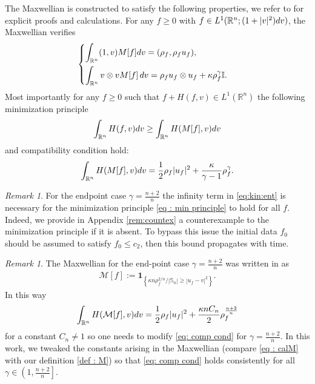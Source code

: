 \documentclass{amsart}
\theoremstyle{plain}
\theoremstyle{remark}
\newtheorem{remark}[theorem]{Remark}
\numberwithin{equation}{section}
\newcommand{\bbI}{\mathbb I}
\newcommand{\bbS}{\mathbb S}
\newcommand{\R}{\mathbb{R}}
\newcommand{\dv}{\textnormal{d}v}
\begin{document}
The Maxwellian is constructed to satisfy the following properties, we refer to \cite{bouchut1999,berthelinbouchut2000,choihwang2024} for explicit proofs and calculations. For any $f\ge 0$ with $f\in L^1(\R^n;(1+|v|^2)\dv)$, the Maxwellian verifies
\begin{equation*}
\begin{cases}
    \displaystyle\int_{\R^n} (1,v)M[f] \dv = (\rho_f, \rho_f u_f),\\[9pt]
    \displaystyle\int_{\R^n} v \otimes v M[f]  \, \dv = \rho_f u_f \otimes u_f + \kappa \rho_f^\gamma \bbI.
\end{cases}
\end{equation*}
Most importantly for any $f\ge 0$ such that $f+ H(f,v)\in L^1(\R^n)$ the following minimization principle
\begin{equation}\label{eq : min principle}
\int_{\R^n} H(f,v)\dv \ge \int_{\R^n} H(M[f],v)\dv
\end{equation}
and compatibility condition hold:
\begin{equation}
\label{eq: comp cond}
    \int_{\R^n} H(M[f],v)\dv = \frac{1}{2}\rho_f |u_f|^2 + \frac{\kappa}{\gamma-1} \rho_f^{\gamma}.
\end{equation}
\begin{remark}
    For the endpoint case $\gamma = \frac{n+2}{n}$ the infinity term in \eqref{eq:kin:ent} is necessary for the minimization principle \eqref{eq : min principle} to hold for all $f$. Indeed, we provide in Appendix \ref{rem:countex} a counterexample to the minimization principle if it is absent. To bypass this issue the initial data $f_0$ should be assumed to satisfy $f_0 \le c_2$, then this bound propagates with time.
\end{remark}
\begin{remark}
\label{rem : max const factor}
The Maxwellian for the end-point case $\gamma = \frac{n+2}{n}$ was written in \cite{berthelinvasseur2005, choihwang2024} as
\begin{align}
\label{eq : calM}
    \mathcal{M}[f] := \mathbf{1}_{\left\{ \kappa n\rho_f^{2/n}/|\bbS_n| \ge |u_f - v|^2 \right\}}.
\end{align}
In this way
\begin{equation*}
    \int_{\R^n} H(\mathcal{M}[f],v) \dv = \frac{1}{2}\rho_f |u_f|^2 + \frac{\kappa n C_n}{2}\rho_f^{\frac{n+2}{n}}
\end{equation*}
for a constant $C_n\ne 1$ so one needs to modify \eqref{eq: comp cond} for $\gamma=\frac{n+2}{n}$. In this work, we tweaked the constants arising in the Maxwellian (compare \eqref{eq : calM} with our definition \eqref{def : M}) so that \eqref{eq: comp cond} holds consistently for all $\gamma\in\left(1,\frac{n+2}{n}\right]$.
\end{remark}
\end{document}
